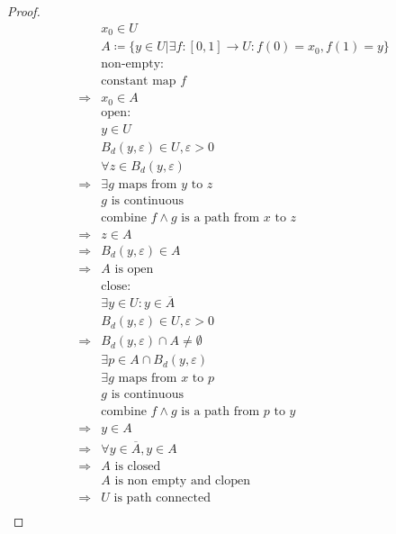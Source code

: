 \documentclass{article}
\begin{document}
\begin{proof}
    \begin{align*}
        &x_0\in U\\
        &A\coloneqq \{y\in U|\exists f:[0,1]\rightarrow U:f(0)=x_0,f(1)=y\}\\
        &\text{non-empty}:\\
        &\text{constant map }f\\
        \Rightarrow&x_0\in A\\
        &\text{open}:\\
        &y\in U\\
        &B_d(y,\varepsilon)\in U,\varepsilon>0\\
        &\forall z\in B_d(y,\varepsilon)\\
        \Rightarrow&\exists g\text{ maps from }y\text{ to }z\\
        &g\text{ is continuous}\\
        &\text{combine }f\land g\text{ is a path from }x\text{ to }z\\
        \Rightarrow&z\in A\\
        \Rightarrow&B_d(y,\varepsilon)\in A\\
        \Rightarrow&A\text{ is open}\\
        &\text{close}:\\
        &\exists y\in U:y\in \overline{A}\\
        &B_d(y,\varepsilon)\in U,\varepsilon>0\\
        \Rightarrow&B_d(y,\varepsilon)\cap A\ne \emptyset\\
        &\exists p\in A\cap B_d(y,\varepsilon)\\
        &\exists g\text{ maps from }x\text{ to }p\\
        &g\text{ is continuous}\\
        &\text{combine }f\land g\text{ is a path from }p\text{ to }y\\
        \Rightarrow&y\in A\\
        \Rightarrow&\forall y\in \overline{A},y\in A\\
        \Rightarrow&A\text{ is closed}\\
        &A\text{ is non empty and clopen}\\
        \Rightarrow&U\text{ is path connected}\\
    \end{align*}
\end{proof}

\newpage
\end{document}
